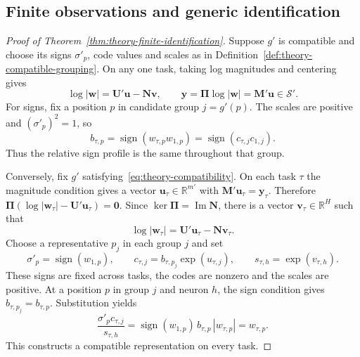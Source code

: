\subsection{Finite observations and generic identification}
\label{app:theory-identification}

\begin{proof}[Proof of Theorem~\ref{thm:theory-finite-identification}]
    Suppose $g'$ is compatible and choose its signs $\sigma'_p$,
    code values and scales as in Definition~\ref{def:theory-compatible-grouping}.
    On any one task, taking log magnitudes and centering gives
    \begin{equation*}
        \log|\mathbf w|=\mathbf U'\mathbf u-\mathbf N\mathbf v,
        \qquad
        \mathbf y=\boldsymbol\Pi\log|\mathbf w|
                  =\mathbf M'\mathbf u\in\mathcal S'.
    \end{equation*}
    For signs, fix a position $p$ in candidate group $j=g'(p)$.
    The scales are positive and $(\sigma'_p)^2=1$, so
    \begin{equation*}
        b_{\tau,p}=\operatorname{sign}(w_{\tau,p}w_{1,p})
                  =\operatorname{sign}(c_{\tau,j}c_{1,j}).
    \end{equation*}
    Thus the relative sign profile is the same throughout that group.

    Conversely, fix $g'$ satisfying~\eqref{eq:theory-compatibility}.
    On each task $\tau$ the magnitude condition gives a vector
    $\mathbf u_\tau\in\mathbb R^{m'}$ with
    $\mathbf M'\mathbf u_\tau=\mathbf y_\tau$. Therefore
    $\boldsymbol\Pi(\log|\mathbf w_\tau|-\mathbf U'\mathbf u_\tau)=\mathbf0$.
    Since $\ker\boldsymbol\Pi=\operatorname{Im}\mathbf N$, there is a
    vector $\mathbf v_\tau\in\mathbb R^H$ such that
    \begin{equation*}
        \log|\mathbf w_\tau|=\mathbf U'\mathbf u_\tau-\mathbf N\mathbf v_\tau .
    \end{equation*}
    Choose a representative $p_j$ in each group $j$ and set
    \begin{equation*}
        \sigma'_p=\operatorname{sign}(w_{1,p}),\qquad
        c_{\tau,j}=b_{\tau,p_j}\exp(u_{\tau,j}),\qquad
        s_{\tau,h}=\exp(v_{\tau,h}).
    \end{equation*}
    These signs are fixed across tasks, the codes are nonzero and
    the scales are positive. At a position $p$ in group $j$ and
    neuron $h$, the sign condition gives $b_{\tau,p_j}=b_{\tau,p}$.
    Substitution yields
    \begin{equation*}
        \frac{\sigma'_p c_{\tau,j}}{s_{\tau,h}}
        =\operatorname{sign}(w_{1,p})\,b_{\tau,p}\,|w_{\tau,p}|
        =w_{\tau,p}.
    \end{equation*}
    This constructs a compatible representation on every task.

\end{proof}

